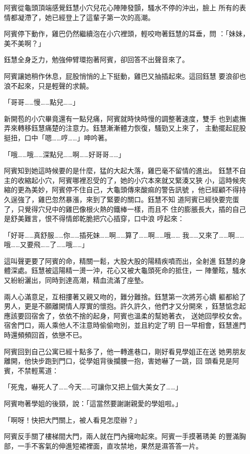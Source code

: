 阿賓從龜頭頂端感覺鈺慧小穴兒花心陣陣發顫，騷水不停的沖出，臉上
所有的表情都凝滯了，她已經登上了這輩子第一次的高潮。

阿賓停下動作，雞巴仍然繼續泡在小穴裡頭，輕咬吻著鈺慧的耳垂，問
：「妹妹，美不美啊？」

鈺慧全身乏力，勉強伸臂環抱著阿賓，卻回答不出聲音來了。

阿賓讓她稍作休息，屁股悄悄的上下挺動，雞巴又抽插起來。這回鈺慧
要浪卻也浪不起來，只是輕聲的求饒。

「哥哥……慢……點兒……」

新開苞的小穴畢竟還有一點兒痛，阿賓就時快時慢的調整著速度，雙手
也到處撫弄來轉移鈺慧痛楚的注意力。鈺慧漸漸體力恢復，騷勁又上來了，
主動擺起屁股挺扭，口中「嗯……哼……」呻吟著。

「哦……哦……深點兒……啊……好哥哥……」

阿賓知到她這時候要的是什麼，猛的大起大落，雞巴毫不留情的進出。
鈺慧不自主的收縮起小穴，阿賓哪裡忍受的了，她的小穴本來就又緊湊又狹
小，這時候夾縮的更為美妙，阿賓停不住自己，大龜頭傳來酸痲的警告訊號
，他已經顧不得持久逞強了，雞巴忽然暴漲，來到了緊要的關口。鈺慧不知
道阿賓已經快要完蛋了，只覺得穴兒中的雞巴像根火熱的鐵棒一樣，而且不
住的膨脹長大，插的自己是舒美難言，恨不得情郎乾脆把穴心插穿，口中浪
哼起來：

「好哥……真舒服……你……插死妹……啊……算了……啊……哦……
我……又來了……啊……哦……又要飛……了……哦……」

這叫聲更要了阿賓的命，精關一鬆，大股大股的陽精疾噴而出，全射進
鈺慧的身體深處。鈺慧被這陽精一燙一沖，花心又被大龜頭死命的抵住，一
陣暈眩，騷水又紛紛灑出，同時到達高潮，精血流滿了座墊。

兩人心滿意足，互相摟著又親又吻的，難分難捨。鈺慧第一次將芳心嬌
軀都給了男人，更是不願離開情人厚實的懷抱。許久許久，他們才又分開來
，鈺慧惦念起應該要回宿舍了，依依不捨的起身，阿賓也溫柔的幫她著衣，
送她回學校女舍。宿舍門口，兩人乘他人不注意時偷偷吻別，並且約定了明
日一早相會，鈺慧進門時還頻頻回首，依戀不已。

阿賓回到自己公寓已經十點多了，他一轉進巷口，剛好看見學姐正在送
她男朋友離開，他快步跑到門口，從學姐背後攔腰一抱，害她嚇了一跳，回
頭看見是阿賓，不禁輕罵道：

「死鬼，嚇死人了……今天……可讓你又把上個大美女了……」

阿賓吻著學姐的後頸，說：「這當然要謝謝親愛的學姐啦。」

「啊呀！快把大門關上，被人看見怎麼辦？」

阿賓反手關了樓梯間大門，兩人就在門內擁吻起來。阿賓一手摸著琇美
的豐滿胸部，一手不客氣的伸進短裙裡面，直攻禁地，果然是濕答答一片。

